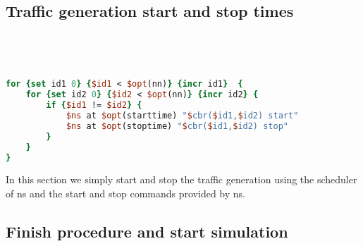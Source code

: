 \documentclass[11pt]{article}
\begin{document}
\subsection{Traffic generation start and stop times}
\ 
{\scriptsize\tt
\begin{lstlisting}[language=tcl]
for {set id1 0} {$id1 < $opt(nn)} {incr id1}  {
	for {set id2 0} {$id2 < $opt(nn)} {incr id2} {
		if {$id1 != $id2} {
			$ns at $opt(starttime) "$cbr($id1,$id2) start"
			$ns at $opt(stoptime) "$cbr($id1,$id2) stop"
		}
	}
}
\end{lstlisting}
}

In this section we simply start and stop the traffic generation using the scheduler of ns and the start and stop commands provided by ns.



\subsection{Finish procedure and start simulation}
\ 
\end{document}
